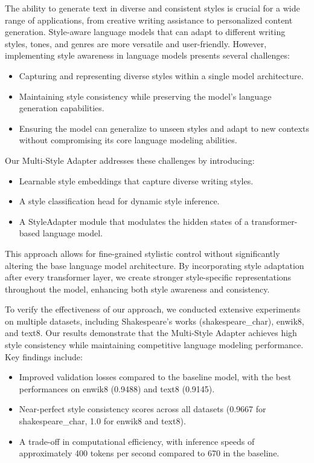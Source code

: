 \documentclass{article} %
\begin{document}
The ability to generate text in diverse and consistent styles is crucial for a wide range of applications, from creative writing assistance to personalized content generation. Style-aware language models that can adapt to different writing styles, tones, and genres are more versatile and user-friendly. However, implementing style awareness in language models presents several challenges:

\begin{itemize}
    \item Capturing and representing diverse styles within a single model architecture.
    \item Maintaining style consistency while preserving the model's language generation capabilities.
    \item Ensuring the model can generalize to unseen styles and adapt to new contexts without compromising its core language modeling abilities.
\end{itemize}

Our Multi-Style Adapter addresses these challenges by introducing:

\begin{itemize}
    \item Learnable style embeddings that capture diverse writing styles.
    \item A style classification head for dynamic style inference.
    \item A StyleAdapter module that modulates the hidden states of a transformer-based language model.
\end{itemize}

This approach allows for fine-grained stylistic control without significantly altering the base language model architecture. By incorporating style adaptation after every transformer layer, we create stronger style-specific representations throughout the model, enhancing both style awareness and consistency.

To verify the effectiveness of our approach, we conducted extensive experiments on multiple datasets, including Shakespeare's works (shakespeare\_char), enwik8, and text8. Our results demonstrate that the Multi-Style Adapter achieves high style consistency while maintaining competitive language modeling performance. Key findings include:

\begin{itemize}
    \item Improved validation losses compared to the baseline model, with the best performances on enwik8 (0.9488) and text8 (0.9145).
    \item Near-perfect style consistency scores across all datasets (0.9667 for shakespeare\_char, 1.0 for enwik8 and text8).
    \item A trade-off in computational efficiency, with inference speeds of approximately 400 tokens per second compared to 670 in the baseline.
\end{itemize}
\end{document}
